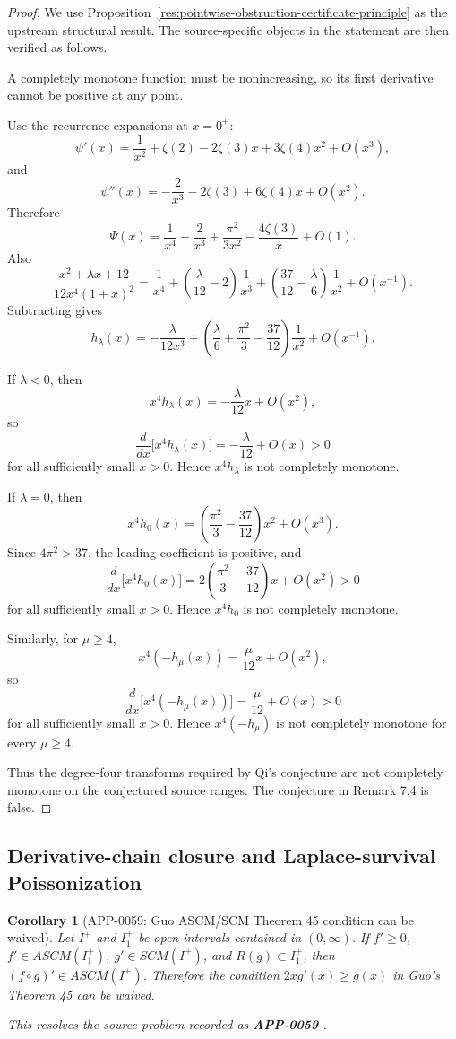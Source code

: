 \documentclass[11pt]{article}
\numberwithin{equation}{section}
\newtheorem{corollary}[theorem]{Corollary}
\theoremstyle{definition}
\theoremstyle{remark}
\newcommand{\1}{\mathbf 1}
\begin{document}
\begin{proof}
We use Proposition~\ref{res:pointwise-obstruction-certificate-principle} as the upstream structural result. The source-specific objects in the statement are then verified as follows.

A completely monotone function must be nonincreasing, so its first derivative cannot be positive at any point.

Use the recurrence expansions at \(x=0^+\):
\[
\psi'(x)=\frac1{x^2}+\zeta(2)-2\zeta(3)x+3\zeta(4)x^2+O(x^3),
\]
and
\[
\psi''(x)=-\frac2{x^3}-2\zeta(3)+6\zeta(4)x+O(x^2).
\]
Therefore
\[
\Psi(x)
=\frac1{x^4}-\frac2{x^3}+\frac{\pi^2}{3x^2}
-\frac{4\zeta(3)}x+O(1).
\]
Also
\[
\frac{x^2+\lambda x+12}{12x^4(1+x)^2}
=\frac1{x^4}+\left(\frac{\lambda}{12}-2\right)\frac1{x^3}
+\left(\frac{37}{12}-\frac{\lambda}{6}\right)\frac1{x^2}
+O(x^{-1}).
\]
Subtracting gives
\[
h_\lambda(x)
=-\frac{\lambda}{12x^3}
+\left(\frac{\lambda}{6}+\frac{\pi^2}{3}-\frac{37}{12}\right)\frac1{x^2}
+O(x^{-1}).
\]

If \(\lambda<0\), then
\[
x^4h_\lambda(x)=-\frac{\lambda}{12}x+O(x^2),
\]
so
\[
\frac{d}{dx}\bigl[x^4h_\lambda(x)\bigr]
=-\frac{\lambda}{12}+O(x)>0
\]
for all sufficiently small \(x>0\). Hence \(x^4h_\lambda\) is not completely monotone.

If \(\lambda=0\), then
\[
x^4h_0(x)
=\left(\frac{\pi^2}{3}-\frac{37}{12}\right)x^2+O(x^3).
\]
Since \(4\pi^2>37\), the leading coefficient is positive, and
\[
\frac{d}{dx}\bigl[x^4h_0(x)\bigr]
=2\left(\frac{\pi^2}{3}-\frac{37}{12}\right)x+O(x^2)>0
\]
for all sufficiently small \(x>0\). Hence \(x^4h_0\) is not completely monotone.

Similarly, for \(\mu\ge4\),
\[
x^4(-h_\mu(x))=\frac{\mu}{12}x+O(x^2),
\]
so
\[
\frac{d}{dx}\bigl[x^4(-h_\mu(x))\bigr]
=\frac{\mu}{12}+O(x)>0
\]
for all sufficiently small \(x>0\). Hence \(x^4(-h_\mu)\) is not completely monotone for every \(\mu\ge4\).

Thus the degree-four transforms required by Qi's conjecture are not completely monotone on the conjectured source ranges. The conjecture in Remark 7.4 is false.
\end{proof}


\subsection{Derivative-chain closure and Laplace-survival Poissonization}
\begin{corollary}[APP-0059: Guo ASCM/SCM Theorem 45 condition can be waived]
\label{res:guo-ascm-scm-derivativecomposition-nocondition}
Let \(I^+\) and \(I_1^+\) be open intervals contained in \((0,\infty)\). If \(f'\ge0\), \(f'\in ASCM(I_1^+)\), \(g'\in SCM(I^+)\), and \(R(g)\subset I_1^+\), then \((f\circ g)'\in ASCM(I^+)\). Therefore the condition \(2xg'(x)\ge g(x)\) in Guo's Theorem 45 can be waived.



This resolves the source problem recorded as \textbf{APP-0059} \cite{app-app-0059-source}.
\end{corollary}
\end{document}

